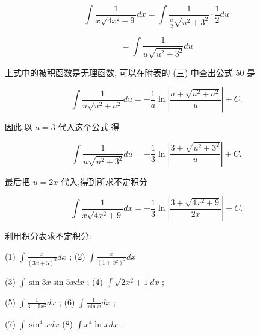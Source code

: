 \documentclass[lang=cn,newtx,10pt,scheme=chinese]{elegantbook}
\begin{document}
\[
\int \frac{1}{x\sqrt{4{x}^{2} + 9}}{dx} = \int \frac{1}{\frac{u}{2}\sqrt{{u}^{2} + {3}^{2}}} \cdot \frac{1}{2}{du}
\]

\[
= \int \frac{1}{u\sqrt{{u}^{2} + {3}^{2}}}{du}
\]

上式中的被积函数是无理函数, 可以在附表的 (三) 中查出公式 50 是

\[
\int \frac{1}{u\sqrt{{u}^{2} + {a}^{2}}}{du} = - \frac{1}{a}\ln \left| \frac{a + \sqrt{{u}^{2} + {a}^{2}}}{u}\right| + C.
\]

因此,以 \(a = 3\) 代入这个公式,得

\[
\int \frac{1}{u\sqrt{{u}^{2} + {3}^{2}}}{du} = - \frac{1}{3}\ln \left| \frac{3 + \sqrt{{u}^{2} + {3}^{2}}}{u}\right| + C.
\]

最后把 \(u = {2x}\) 代入,得到所求不定积分

\[
\int \frac{1}{x\sqrt{4{x}^{2} + 9}}{dx} = - \frac{1}{3}\ln \left| \frac{3 + \sqrt{4{x}^{2} + 9}}{2x}\right| + C.
\]

\begin{problemset}[练习]

\item *利用积分表求不定积分:

(1) \(\int \frac{x}{{\left( 3x + 5\right) }^{2}}{dx}\) ; (2) \(\int \frac{x}{{\left( 1 + {x}^{2}\right) }^{2}}{dx}\)

(3) \(\int \sin {3x}\sin {5xdx}\) ; (4) \(\int \sqrt{2{x}^{2} + 1}{dx}\) ;

(5) \(\int \frac{1}{3 + 5{x}^{2}}{dx}\) ; (6) \(\int \frac{1}{\sin x}{dx}\) ;

(7) \(\int {\sin }^{4}{xdx}\) (8) \(\int {x}^{4}\ln {xdx}\) .

\end{problemset}
\end{document}
